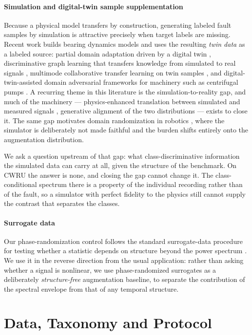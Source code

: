 \documentclass[preprint,12pt]{elsarticle}
\begin{document}
\paragraph{Simulation and digital-twin sample supplementation}
Because a physical model transfers by construction, generating labeled fault
samples by simulation is attractive precisely when target labels are missing.
Recent work builds bearing dynamics models and uses the resulting \emph{twin
data} as a labeled source: partial domain adaptation driven by a digital twin
\cite{zhang2023dt}, discriminative graph learning that transfers knowledge from
simulated to real signals \cite{xu2024dt}, multimode collaborative transfer
learning on twin samples \cite{liu2024twin}, and digital-twin-assisted domain
adversarial frameworks for machinery such as centrifugal pumps
\cite{kumar2024dt}. A recurring theme in this literature is the
simulation-to-reality gap, and much of the machinery --- physics-enhanced
translation between simulated and measured signals \cite{ming2026physics},
generative alignment of the two distributions \cite{xiao2026sim2real} --- exists
to close it. The same gap motivates domain randomization in robotics
\cite{tobin2017domain}, where the simulator is deliberately not made faithful
and the burden shifts entirely onto the augmentation distribution.

We ask a question upstream of that gap: what class-discriminative information
the simulated data can carry at all, given the structure of the benchmark. On
CWRU the answer is none, and closing the gap cannot change it. The
class-conditional spectrum there is a property of the individual recording
rather than of the fault, so a simulator with perfect fidelity to the physics
still cannot supply the contrast that separates the classes.

\paragraph{Surrogate data}
Our phase-randomization control follows the standard surrogate-data procedure
for testing whether a statistic depends on structure beyond the power spectrum
\cite{theiler1992surrogate, schreiber2000surrogate}. We use it in the reverse
direction from the usual
application: rather than asking whether a signal is nonlinear, we use
phase-randomized surrogates as a deliberately \emph{structure-free} augmentation
baseline, to separate the contribution of the spectral envelope from that of any
temporal structure.

\section{Data, Taxonomy and Protocol}
\label{sec:setup}
\end{document}
